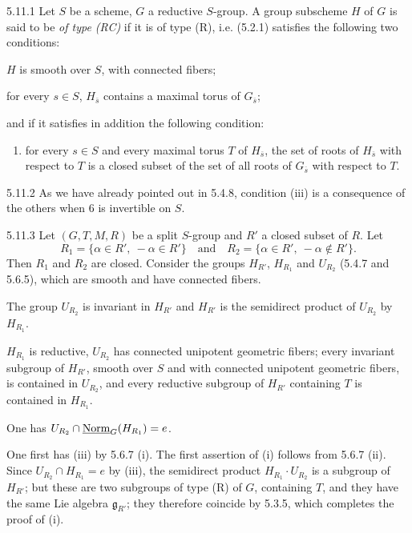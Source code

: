\begin{definition}{5.11.1}\label{XXII.5.11.1}
Let $S$ be a scheme, $G$ a reductive $S$-group. A group subscheme $H$ of $G$ is said to be \emph{of type (RC)} if it is of type (R), i.e. (5.2.1) satisfies the following two conditions:
\begin{enumeratei}
\item $H$ is smooth over $S$, with connected fibers;
\item for every $s\in S$, $H_{\overline s}$ contains a maximal torus of $G_{\overline s}$;
\end{enumeratei}
and if it satisfies in addition the following condition:
\begin{enumerate}[label=\textup{(\roman*)},start=3]
\item for every $s\in S$ and every maximal torus $T$ of $H_{\overline s}$, the set of roots of $H_{\overline s}$ with respect to $T$ is a closed subset of the set of all roots of $G_{\overline s}$ with respect to $T$.
\end{enumerate}
\end{definition}
\begin{remark}{5.11.2}\label{XXII.5.11.2}
As we have already pointed out in 5.4.8, condition (iii) is a consequence of the others when $6$ is invertible on $S$.{\renewcommand{\thefootnote}{(59)}}
\end{remark}
\begin{lemma}{5.11.3}\label{XXII.5.11.3}
Let $(G,T,M,R)$ be a split $S$-group and $R'$ a closed subset of $R$. Let
\[
R_1=\{\alpha\in R',\ -\alpha\in R'\}\quad\text{and}\quad
R_2=\{\alpha\in R',\ -\alpha\notin R'\}.
\]
Then $R_1$ and $R_2$ are closed. Consider the groups $H_{R'}$, $H_{R_1}$ and $U_{R_2}$ (5.4.7 and 5.6.5), which are smooth and have connected fibers.
\begin{enumeratei}
\item The group $U_{R_2}$ is invariant in $H_{R'}$ and $H_{R'}$ is the semidirect product of $U_{R_2}$ by $H_{R_1}$.
\item $H_{R_1}$ is reductive, $U_{R_2}$ has connected unipotent geometric fibers; every invariant subgroup of $H_{R'}$, smooth over $S$ and with connected unipotent geometric fibers, is contained in $U_{R_2}$, and every reductive subgroup of $H_{R'}$ containing $T$ is contained in $H_{R_1}$.
\item One has $U_{R_2}\cap\underline{\mathrm{Norm}}_G(H_{R_1})=e$.
\end{enumeratei}
\end{lemma}
One first has (iii) by 5.6.7 (i). The first assertion of (i) follows from 5.6.7 (ii). Since $U_{R_2}\cap H_{R_1}=e$ by (iii), the semidirect product $H_{R_1}\cdot U_{R_2}$ is a subgroup of $H_{R'}$; but these are two subgroups of type (R) of $G$, containing $T$, and they have the same Lie algebra $\mathfrak g_{R'}$; they therefore coincide by 5.3.5, which completes the proof of (i).

